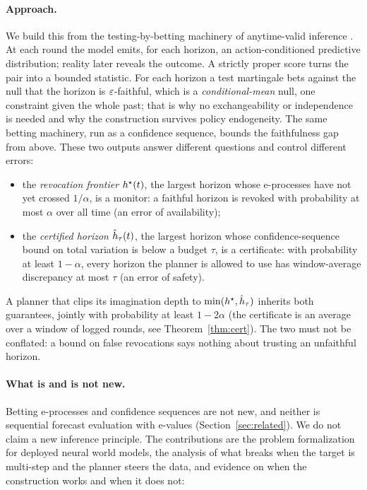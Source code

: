 \paragraph{Approach.}
We build this from the testing-by-betting machinery of anytime-valid inference
\citep{shafer2021testing,ramdas2023savi,waudbysmith2024betting}. At each round the model emits, for
each horizon, an action-conditioned predictive distribution; reality later reveals the outcome. A
strictly proper score \citep{gneiting2007strictly} turns the pair into a bounded statistic. For each
horizon a test martingale bets against the null that the horizon is $\varepsilon$-faithful, which is a
\emph{conditional-mean} null, one constraint given the whole past; that is why no exchangeability
or independence is needed and why the construction survives policy endogeneity. The same
betting machinery, run as a confidence sequence, bounds the faithfulness gap from above. These two
outputs answer different questions and control different errors:

\begin{itemize}[leftmargin=1.4em,itemsep=2pt]
\item the \emph{revocation frontier} $h^{\star}(t)$, the largest horizon whose e-processes have not
yet crossed $1/\alpha$, is a monitor: a faithful horizon is revoked with probability at most
$\alpha$ over all time (an error of availability);
\item the \emph{certified horizon} $\hat h_\tau(t)$, the largest horizon whose confidence-sequence
bound on total variation is below a budget $\tau$, is a certificate: with probability at least
$1-\alpha$, every horizon the planner is allowed to use has window-average discrepancy at most $\tau$ (an error of safety).
\end{itemize}

A planner that clips its imagination depth to $\min(h^{\star},\hat h_\tau)$ inherits both guarantees, jointly with probability at least $1-2\alpha$ (the certificate is an average over a window of logged rounds, see Theorem~\ref{thm:cert}).
The two must not be conflated: a bound on false revocations says nothing about trusting an
unfaithful horizon.

\paragraph{What is and is not new.}
Betting e-processes and confidence sequences are not new, and neither is sequential forecast
evaluation with e-values (Section~\ref{sec:related}). We do not claim a new inference principle. The
contributions are the problem formalization for deployed neural world models, the analysis of what breaks
when the target is multi-step and the planner steers the data, and evidence on when the construction works and when it
does not:


